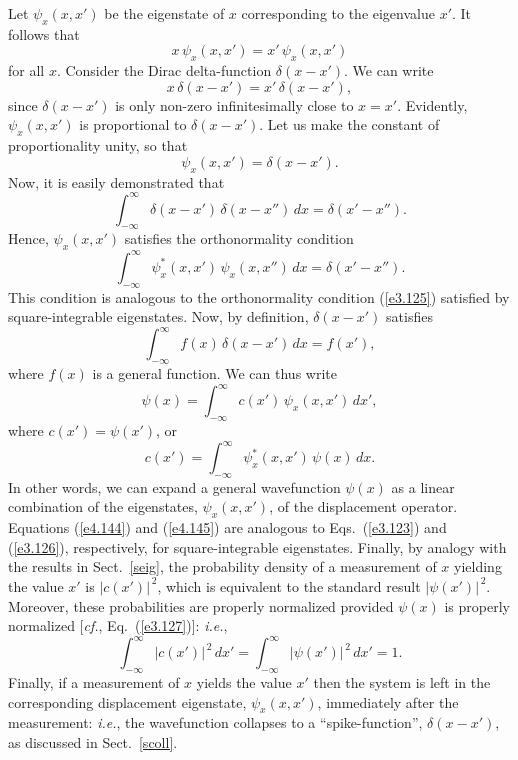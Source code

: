 Let $\psi_x(x,x')$ be the eigenstate of $x$ corresponding to the eigenvalue $x'$. It follows that
\begin{equation}
x\,\psi_x(x,x') = x'\,\psi_x(x,x')
\end{equation}
for all $x$. Consider the Dirac delta-function $\delta(x-x')$. We can write
\begin{equation}
x\,\delta(x-x') = x'\,\delta(x-x'),
\end{equation}
since $\delta(x-x')$ is only non-zero infinitesimally close to $x=x'$. 
Evidently, $\psi_x(x,x')$ is proportional to $\delta(x-x')$. Let us make the
constant of proportionality unity, so that
\begin{equation}
\psi_x(x,x') = \delta(x-x').
\end{equation}
Now, it is easily demonstrated that
\begin{equation}
\int_{-\infty}^{\infty} \delta(x-x')\,\delta(x-x'')\,dx = \delta(x'-x'').
\end{equation}
Hence, $\psi_x(x,x')$ satisfies the orthonormality condition
\begin{equation}\label{e4.143}
\int_{-\infty}^\infty \psi_x^\ast(x,x')\,\psi_x(x,x'')\,dx = \delta(x'-x'').
\end{equation}
This condition is analogous to the orthonormality condition (\ref{e3.125})
satisfied by  square-integrable  eigenstates.
Now, by definition, $\delta(x-x')$ satisfies
\begin{equation}
\int_{-\infty}^\infty f(x)\,\delta(x-x')\,dx = f(x'),
\end{equation}
where $f(x)$ is a general function. We can thus write
\begin{equation}\label{e4.144}
\psi(x) = \int_{-\infty}^\infty c(x')\,\psi_x(x,x')\,dx',
\end{equation}
where $c(x')=\psi(x')$, or
\begin{equation}\label{e4.145}
c(x') = \int_{-\infty}^\infty \psi_x^\ast(x,x')\,\psi(x)\,dx.
\end{equation}
In other words, we can expand a general wavefunction $\psi(x)$
as a linear combination of the eigenstates, $\psi_x(x,x')$, of the
displacement operator. Equations (\ref{e4.144}) and (\ref{e4.145})
are analogous to Eqs.~(\ref{e3.123}) and (\ref{e3.126}), respectively, 
for square-integrable eigenstates. Finally, by analogy with the
results in Sect.~\ref{seig}, the probability density of a measurement of $x$
yielding the value $x'$ is $|c(x')|^{\,2}$, which is equivalent to the
standard result
$|\psi(x')|^{\,2}$. Moreover, these probabilities are properly normalized
provided $\psi(x)$ is properly normalized [{\em cf.}, Eq.~(\ref{e3.127})]: {\em i.e.},
\begin{equation}
\int_{-\infty}^\infty |c(x')|^{\,2}\,dx'= \int_{-\infty}^\infty |\psi(x')|^{\,2}\,dx' =1.
\end{equation}
Finally, if a measurement of $x$ yields the value $x'$ then the system
is left in the corresponding displacement eigenstate, $\psi_x(x,x')$, immediately after the measurement: {\em i.e.}, the wavefunction
collapses to a ``spike-function'', $\delta(x-x')$, as discussed in Sect.~\ref{scoll}.

